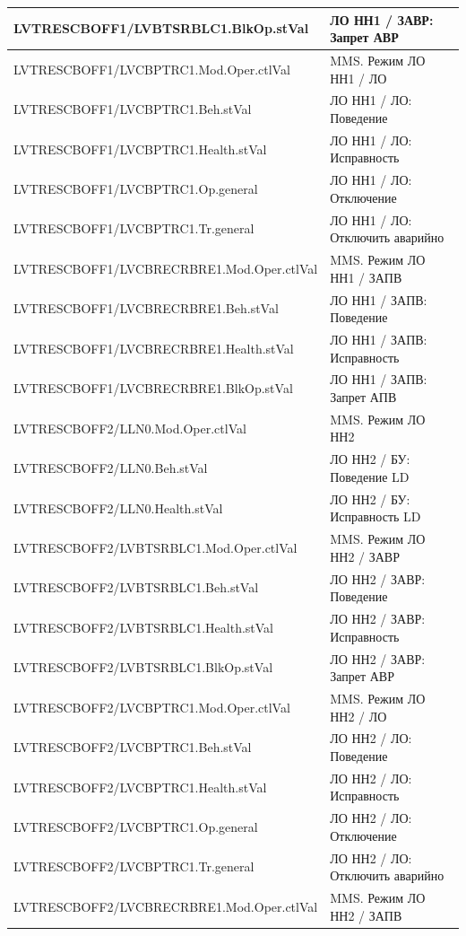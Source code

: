 \begin{longtable}{|>{\raggedright\arraybackslash}m{}|>{\raggedright\arraybackslash}m{}|}
\hline
LVTRESCBOFF1/LVBTSRBLC1.BlkOp.stVal & ЛО НН1 / ЗАВР: Запрет АВР \\
\hline
LVTRESCBOFF1/LVCBPTRC1.Mod.Oper.ctlVal & MMS. Режим ЛО НН1 / ЛО \\
\hline
LVTRESCBOFF1/LVCBPTRC1.Beh.stVal & ЛО НН1 / ЛО: Поведение \\
\hline
LVTRESCBOFF1/LVCBPTRC1.Health.stVal & ЛО НН1 / ЛО: Исправность \\
\hline
LVTRESCBOFF1/LVCBPTRC1.Op.general & ЛО НН1 / ЛО: Отключение \\
\hline
LVTRESCBOFF1/LVCBPTRC1.Tr.general & ЛО НН1 / ЛО: Отключить аварийно \\
\hline
LVTRESCBOFF1/LVCBRECRBRE1.Mod.Oper.ctlVal & MMS. Режим ЛО НН1 / ЗАПВ \\
\hline
LVTRESCBOFF1/LVCBRECRBRE1.Beh.stVal & ЛО НН1 / ЗАПВ: Поведение \\
\hline
LVTRESCBOFF1/LVCBRECRBRE1.Health.stVal & ЛО НН1 / ЗАПВ: Исправность \\
\hline
LVTRESCBOFF1/LVCBRECRBRE1.BlkOp.stVal & ЛО НН1 / ЗАПВ: Запрет АПВ \\
\hline
LVTRESCBOFF2/LLN0.Mod.Oper.ctlVal & MMS. Режим ЛО НН2 \\
\hline
LVTRESCBOFF2/LLN0.Beh.stVal & ЛО НН2 / БУ: Поведение LD \\
\hline
LVTRESCBOFF2/LLN0.Health.stVal & ЛО НН2 / БУ: Исправность LD \\
\hline
LVTRESCBOFF2/LVBTSRBLC1.Mod.Oper.ctlVal & MMS. Режим ЛО НН2 / ЗАВР \\
\hline
LVTRESCBOFF2/LVBTSRBLC1.Beh.stVal & ЛО НН2 / ЗАВР: Поведение \\
\hline
LVTRESCBOFF2/LVBTSRBLC1.Health.stVal & ЛО НН2 / ЗАВР: Исправность \\
\hline
LVTRESCBOFF2/LVBTSRBLC1.BlkOp.stVal & ЛО НН2 / ЗАВР: Запрет АВР \\
\hline
LVTRESCBOFF2/LVCBPTRC1.Mod.Oper.ctlVal & MMS. Режим ЛО НН2 / ЛО \\
\hline
LVTRESCBOFF2/LVCBPTRC1.Beh.stVal & ЛО НН2 / ЛО: Поведение \\
\hline
LVTRESCBOFF2/LVCBPTRC1.Health.stVal & ЛО НН2 / ЛО: Исправность \\
\hline
LVTRESCBOFF2/LVCBPTRC1.Op.general & ЛО НН2 / ЛО: Отключение \\
\hline
LVTRESCBOFF2/LVCBPTRC1.Tr.general & ЛО НН2 / ЛО: Отключить аварийно \\
\hline
LVTRESCBOFF2/LVCBRECRBRE1.Mod.Oper.ctlVal & MMS. Режим ЛО НН2 / ЗАПВ \\

\end{longtable}
